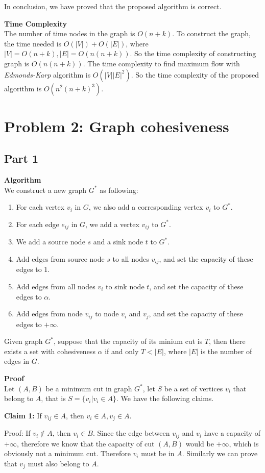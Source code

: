 \documentclass{article}
\newcommand{\Complexity}{\vspace{0.3cm} \noindent\textbf{Time Complexity} \\}
\newcommand{\Proof}{\vspace{0.3cm} \noindent\textbf{Proof} \\}
\newcommand{\Algorithm}{\textbf{Algorithm} \\}
\begin{document}
In conclusion, we have proved that the proposed algorithm is correct.

\Complexity
The number of time nodes in the graph is $O(n+k)$. To construct the graph, the time needed is 
$O(|V|) + O(|E|)$, where $|V| = O(n+k), |E| = O(n(n+k))$. So the time complexity of constructing
graph is $O(n(n+k))$. The time complexity to find maximum flow with \textit{Edmonds-Karp} algorithm
is $O(|V||E|^2)$. So the time complexity of the proposed algorithm is $O(n^2(n+k)^3)$.


\section*{Problem 2: Graph cohesiveness}
\subsection*{Part 1}
\Algorithm
We construct a new graph $G^*$ as following:
\begin{enumerate}
  \item For each vertex $v_i$ in $G$, we also add a corresponding vertex $v_i$ to $G^*$.
  \item For each edge $e_{ij}$ in $G$, we add a vertex $v_{ij}$ to $G^*$.  
  \item We add a source node $s$ and a sink node $t$ to $G^*$.
  \item Add edges from source node $s$ to all nodes $v_{ij}$, and set the capacity of
    these edges to $1$.
  \item Add edges from all nodes $v_i$ to sink node $t$, and set the capacity of these edges to
    $\alpha$.
  \item Add edges from node $v_{ij}$ to node $v_i$ and $v_j$, and set the capacity of these edges
   to $+\infty$.   
\end{enumerate}
Given graph $G^*$, suppose that the capacity of its minium cut is $T$, then there exists a
set with cohesiveness $\alpha$ if and only $T < |E|$, where $|E|$ is the number of edges in $G$. 

\Proof
Let $(A, B)$ be a minimum cut in graph $G^*$, let $S$ be a set of vertices $v_i$ that belong to $A$,
that is $S = \{v_i | v_i \in A \}$. We have the following claims.

\textbf{Claim 1:} If $v_{ij}\in A$, then $v_i \in A, v_j \in A$.

Proof: If $v_i \notin A$, then $v_i \in B$. Since the edge between $v_{ij}$ and $v_i$ have a
capacity of $+\infty$, therefore we know that the capacity of cut $(A, B)$ would be $+\infty$, which
is obviously not a minimum cut. Therefore $v_i$ must be in $A$. Similarly we can prove that $v_j$
must also belong to $A$.   
\end{document}
